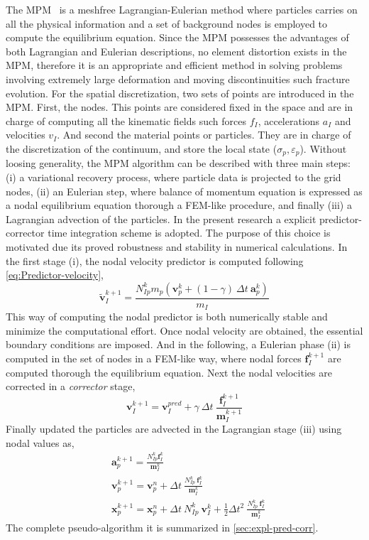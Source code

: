 \message{ !name(2020_EFM_MPM_Eigensoftening.tex)}\documentclass[preprint,12pt,a4paper]{elsarticle}
\newcommand{\vec}[1]{
  \ensuremath{\mathbf{{#1}}}
}
\newcommand{\tens}[1]{
  \ensuremath{\mathbf{{#1}}}
}
\begin{document}
The MPM~\cite{Sulsky1994} is a meshfree Lagrangian-Eulerian method
where particles carries on all the physical information and a set of
background nodes is employed to compute the equilibrium
equation. Since the MPM possesses the advantages of both Lagrangian
and Eulerian descriptions, no element distortion exists in the MPM,
therefore it is an appropriate and efficient method in solving
problems involving extremely large deformation and moving
discontinuities such fracture evolution. For the spatial
discretization, two sets of points are introduced in 
the MPM. First, the nodes. This points are considered fixed in the
space and are in charge of computing all the kinematic fields such
forces $f_I$, accelerations $a_I$ and velocities $v_I$. And second the
material points or particles. They are in charge of the discretization
of the continuum, and store the local state ($\sigma_p,
\varepsilon_p$). Without loosing generality, the MPM algorithm
can be described with three main steps: (i) a variational recovery
process, where particle data is projected to the grid nodes, (ii) an
Eulerian step, where balance of momentum equation is expressed as a
nodal equilibrium equation thorough a FEM-like procedure, and finally
(iii) a Lagrangian advection of the particles. In the present research
a explicit predictor-corrector time integration
scheme is adopted. The purpose of this choice is motivated due its proved
robustness and stability in numerical calculations. In the first stage
(i), the nodal velocity predictor is computed following
\eqref{eq:Predictor-velocity}, 
\begin{equation}
  \label{eq:Predictor-velocity}
  \vec{\tilde{v}}_I^{k+1} = \frac{ N_{Ip}^{k} m_p (\vec{v}_p^k + (1 - \gamma)\ \Delta t\ \vec{a}_p^k)}{m_I}
\end{equation}
This way of computing the nodal predictor is both numerically stable
and minimize the computational effort. Once nodal velocity are
obtained, the essential boundary conditions are imposed. And in the
following, a Eulerian phase (ii) is computed in the set of nodes in a
FEM-like way, where nodal forces $\vec{f}_{I}^{k+1}$ are computed thorough the
equilibrium equation. Next the nodal velocities are corrected in a
\textit{corrector} stage,
\begin{equation}
  \label{eq:Corrector-velocity}
  \vec{v}_{I}^{k+1} = \vec{v}_{I}^{pred} + \gamma\ \Delta t\ \frac{\vec{f}_{I}^{k+1}}{\tens{m}_I^{k+1}}
\end{equation}
Finally updated the particles are advected in the Lagrangian stage (iii) using nodal values as,
\begin{align}
  \label{eq:Update-lagrangian-pce}
        &\vec{a}_p^{k+1} = \frac{N_{Ip}^k\vec{f}_{I}^{k}}{\tens{m}_I^k}\\
      &\vec{v}_p^{k+1} = \vec{v}_p^n + \Delta t\
        \frac{N_{Ip}^k\
        \vec{f}_{I}^{k}}{\tens{m}_I^k}\\
      &\vec{x}_p^{k+1} = \vec{x}_p^n + \Delta t\
         N_{Ip}^k\ \vec{v}_{I}^{k} +
        \frac{1}{2}\Delta t^2\ \frac{N_{Ip}^k\
        \vec{f}_{I}^{k}}{\tens{m}_I^k} 
\end{align}
The complete pseudo-algorithm it is summarized in \ref{sec:expl-pred-corr}.
\end{document}
